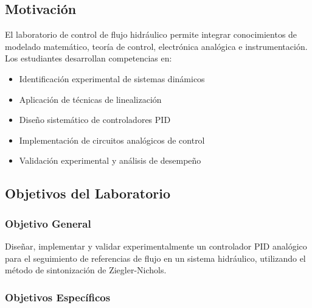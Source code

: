 \documentclass[conference]{IEEEtran}
\begin{document}
\subsection{Motivación}

El laboratorio de control de flujo hidráulico permite integrar conocimientos de modelado matemático, teoría de control, electrónica analógica e instrumentación. Los estudiantes desarrollan competencias en:

\begin{itemize}
\item Identificación experimental de sistemas dinámicos
\item Aplicación de técnicas de linealización
\item Diseño sistemático de controladores PID
\item Implementación de circuitos analógicos de control
\item Validación experimental y análisis de desempeño
\end{itemize}

\subsection{Objetivos del Laboratorio}

\subsubsection{Objetivo General}
Diseñar, implementar y validar experimentalmente un controlador PID analógico para el seguimiento de referencias de flujo en un sistema hidráulico, utilizando el método de sintonización de Ziegler-Nichols.

\subsubsection{Objetivos Específicos}
\end{document}
